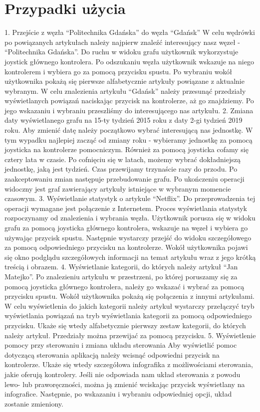 \section{Przypadki użycia}
1. Przejście z węzła “Politechnika Gdańska” do węzła “Gdańsk”
	W celu wędrówki po powiązanych artykułach należy najpierw znaleźć interesujący nasz węzeł - “Politechnika Gdańska”. Do ruchu w widoku grafu użytkownik wykorzystuje joystick głównego kontrolera. Po odszukaniu węzła użytkownik wskazuje na niego kontrolerem i wybiera go za pomocą przycisku spustu. Po wybraniu wokół użytkownika pokażą się pierwsze alfabetycznie artykuły powiązane z aktualnie wybranym. W celu znalezienia artykułu “Gdańsk” należy przesunąć przedziały wyświetlanych powiązań naciskając przycisk na kontrolerze, aż go znajdziemy. Po jego wskazaniu i wybraniu przeszliśmy do interesującego nas artykułu.
2. Zmiana daty wyświetlanego grafu na 15-ty tydzień  2015 roku z daty 2-gi tydzień 2019 roku.
	Aby zmienić datę należy początkowo wybrać interesującą nas jednostkę. W tym wypadku najlepiej zacząć od zmiany roku - wybieramy jednostkę za pomocą joysticka na kontrolerze pomocniczym. Również za pomocą joysticka cofamy się cztery lata w czasie. Po cofnięciu się w latach, możemy wybrać dokładniejszą jednostkę, jaką jest tydzień. Czas przewijamy trzynaście razy do przodu. Po zaakceptowaniu zmian następuje przebudowanie grafu. Po ukończeniu operacji widoczny jest graf zawierający artykuły istniejące w wybranym momencie czasowym.
3. Wyświetlanie statystyk o artykule “Netflix”.
	Do przeprowadzenia tej operacji wymagane jest połączenie z Internetem. Proces wyświetlania statystyk rozpoczynamy od znalezienia i wybrania węzła. Użytkownik porusza się w widoku grafu za pomocą joysticka głównego kontrolera, wskazuje na węzeł i wybiera go używając przycisk spustu. Następnie wystarczy przejść do widoku szczegółowego za pomocą odpowiedniego przycisku na kontrolerze. Wokół użytkownika pojawi się okno podglądu szczegółowych informacji na temat artykułu wraz z jego krótką treścią i obrazem.
4. Wyświetlanie kategorii, do których należy artykuł “Jan Matejko”.
	Po znalezieniu artykułu w przestrzeni, po której poruszamy się za pomocą joysticka głównego kontrolera, należy go wskazać i wybrać za pomocą przycisku spustu. Wokół użytkownika pokażą się połączenia z innymi artykułami. W celu wyświetlenia do jakich kategorii należy artykuł wystarczy przełączyć tryb wyświetlania powiązań na tryb wyświetlania kategorii  za pomocą odpowiedniego przycisku. Ukaże się wtedy alfabetycznie pierwszy zestaw kategorii, do których należy artykuł. Przedziały można przewijać za pomocą przycisku.
5. Wyświetlenie pomocy przy sterowaniu i zmiana układu sterowania
	Aby wyświetlić pomoc dotyczącą sterowania aplikacją należy wcisnąć odpowiedni przycisk na kontrolerze. Ukaże się wtedy szczegółowa infografika z możliwościami sterowania, jakie oferują kontrolery. Jeśli nie odpowiada nam układ sterowania z powodu lewo- lub praworęczności, można ją zmienić wciskając przycisk wyświetlany na infografice. Następnie, po wskazaniu i wybraniu odpowiedniej opcji, układ zostanie zmieniony.
